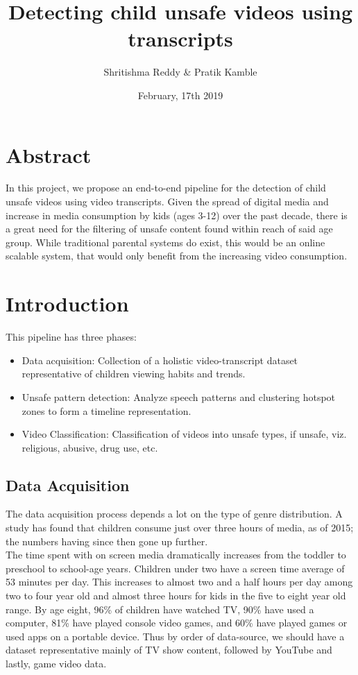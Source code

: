 \documentclass{article}
\title{Detecting child unsafe videos using transcripts}
\author{Shritishma Reddy \& Pratik Kamble}
\date{February, 17th 2019}
\begin{document}
\maketitle

\section{Abstract}

In this project, we propose an end-to-end pipeline for the detection of child unsafe videos
using video transcripts. Given the spread of digital media and increase in media consumption
by kids (ages 3-12) over the past decade, there is a great need for the filtering of unsafe
content found within reach of said age group. While traditional parental systems do exist,
this would be an online scalable system, that would  only benefit from the increasing video
consumption.

\section{Introduction}

This pipeline has three phases:
\begin{itemize}
    \item{Data acquisition: Collection of a holistic video-transcript dataset representative
    of children viewing habits and trends.}
    \item{Unsafe pattern detection: Analyze speech patterns and clustering hotspot zones to
    form a timeline representation.}
    \item{Video Classification: Classification of videos into unsafe types,
    if unsafe, viz. religious, abusive, drug use, etc.}
\end{itemize}

\subsection{Data Acquisition}

The data acquisition process depends a lot on the type of genre distribution.
A study \citep{childtime} has found that  children consume just over three hours of media,
as of 2015; the numbers having since then gone up further. \\

The time spent with on screen media dramatically increases from the toddler to preschool to
school-age years. Children under two have a screen time average of 53 minutes per day.
This increases to almost two and a half hours per day among two to four year old and almost
three hours for kids in the five to eight year old range. By age eight, 96\% of children have
watched TV, 90\% have used a computer, 81\% have played console video games, and 60\% have
played games or used apps on a portable device. Thus by order of data-source, we should have
a dataset representative mainly of TV show content, followed by YouTube and lastly, game video data. \\
\end{document}
